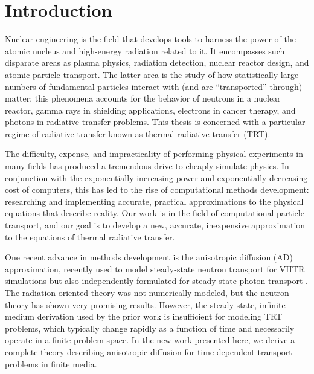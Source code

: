 
\chapter{Introduction}\label{chap:introduction}

Nuclear engineering is the field that develops tools to harness the power of the
atomic nucleus and high-energy radiation related to it. It encompasses such
disparate areas as plasma physics, radiation detection, nuclear reactor design,
and atomic particle transport. The latter area is the study of how
statistically large numbers of fundamental particles interact with (and are
``transported'' through) matter; this
phenomena accounts for the behavior of neutrons in a nuclear reactor,
gamma rays in shielding applications, electrons in cancer therapy, and photons
in radiative transfer problems. This thesis is concerned with a
particular regime of radiative transfer known as thermal radiative transfer
(TRT).

The difficulty, expense, and impracticality of performing physical
experiments in many fields has produced a tremendous drive to cheaply
simulate physics. In conjunction with the exponentially
increasing power and exponentially decreasing cost of computers,
this has led to the rise of computational methods development:
researching and implementing accurate, practical approximations to the physical
equations that describe reality. Our work is in the field of computational
particle transport, and our goal is to develop a new, accurate, inexpensive
approximation to the equations of thermal radiative transfer.

One recent advance in methods development is the anisotropic diffusion (AD)
approximation, recently used to model steady-state neutron transport for VHTR
simulations \cite{Lar2009c,Tra2011} but also independently formulated for
steady-state photon transport \cite{Mor2007}. The radiation-oriented theory was
not
numerically modeled, but the neutron theory has shown very promising results.
However, the steady-state, infinite-medium derivation used by the prior work is
insufficient for modeling TRT problems, which typically change rapidly as a
function of time and necessarily operate in a finite problem space. In the new
work presented here, we derive a complete theory describing anisotropic
diffusion for time-dependent transport problems in finite media. 

